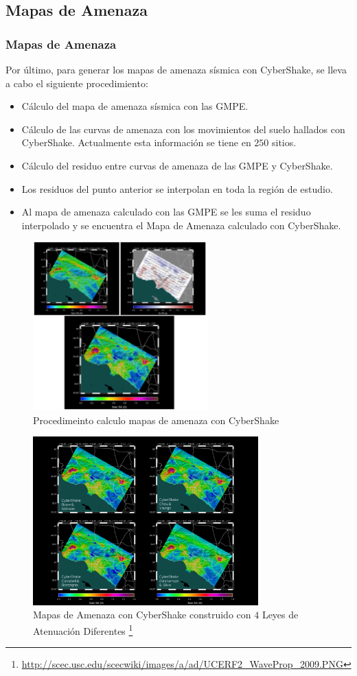 \documentclass{beamer}
\begin{document}
\subsection{Mapas de Amenaza}
\begin{frame}[allowframebreaks]
\frametitle{Mapas de Amenaza}
%
\justifying
%
Por último, para generar los mapas de amenaza sísmica con CyberShake, se lleva a cabo el siguiente procedimiento:
%
\begin{itemize}
%
	\item Cálculo del mapa de amenaza sísmica con las GMPE.
	\item Cálculo de las curvas de amenaza con los movimientos del suelo hallados con CyberShake. Actualmente esta información se tiene en $250$ sitios.
	\item Cálculo del residuo entre curvas de amenaza de las GMPE y CyberShake.
	\item Los residuos del punto anterior se interpolan en toda la región de estudio.
	\item Al mapa de amenaza calculado con las GMPE se les suma el residuo interpolado y se encuentra el Mapa de Amenaza calculado con CyberShake. 
%
\end{itemize}
%
\begin{figure}[h]
	\centering
	\includegraphics[height=6.5cm]{img/ProcesoMapaAmenaza.pdf}
	\caption{Procedimeinto calculo mapas de amenaza con CyberShake \cite[figura 9, página 12]{gravesetal}}
	\vspace{-.5 cm}
\end{figure}
%
\begin{figure}[h]
	\centering
	\includegraphics[height=6.5cm]{img/MapaAmenaza.pdf}
	\caption{Mapas de Amenaza con CyberShake construido con $4$ Leyes de Atenuación Diferentes \footnote{\tiny \url{http://scec.usc.edu/scecwiki/images/a/ad/UCERF2_WaveProp_2009.PNG}}}
	\vspace{-.5 cm}
\end{figure}
%
%
\end{frame}
%
%
\end{document}
